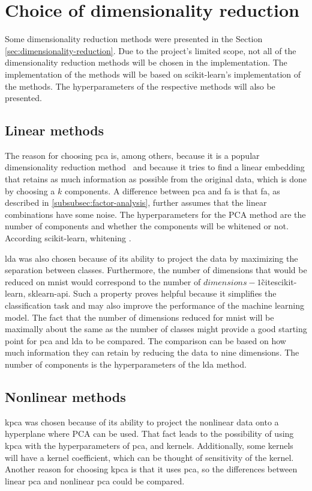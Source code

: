 \section{Choice of dimensionality reduction}\label{sec:choice-of-dimensionality-reduction}
Some dimensionality reduction methods were presented in the Section \ref{sec:dimensionality-reduction}. Due to the project's limited scope, not all of the dimensionality reduction methods will be chosen in the implementation. The implementation of the methods will be based on scikit-learn's implementation of the methods. The hyperparameters of the respective methods will also be presented.



\subsection{Linear methods}
The reason for choosing \gls{pca} is, among others, because it is a popular dimensionality reduction method~\cite{dimensionality-reduction-comparative-review} and because it tries to find a linear embedding that retains as much information as possible from the original data, which is done by choosing a $k$ components. A difference between \gls{pca} and \gls{fa} is that \gls{fa}, as described in \ref{subsubsec:factor-analysis}, further assumes that the linear combinations have some noise. The hyperparameters for the PCA method are the number of components and whether the components will be whitened or not. According scikit-learn, whitening .


\gls{lda} was also chosen because of its ability to project the data by maximizing the separation between classes. Furthermore, the number of dimensions that would be reduced on \gls{mnist} would correspond to the number of $dimensions-1$\~cite{scikit-learn, sklearn-api}. Such a property proves helpful because it simplifies the classification task and may also improve the performance of the machine learning model. The fact that the number of dimensions reduced for \gls{mnist} will be maximally about the same as the number of classes might provide a good starting point for \gls{pca} and \gls{lda} to be compared. The comparison can be based on how much information they can retain by reducing the data to nine dimensions. The number of components is the hyperparameters of the \gls{lda} method.


\subsection{Nonlinear methods}
\gls{kpca} was chosen because of its ability to project the nonlinear data onto a hyperplane where PCA can be used. That fact leads to the possibility of using \gls{kpca} with the hyperparameters of \gls{pca}, and kernels. Additionally, some kernels will have a kernel coefficient, which can be thought of sensitivity of the kernel. Another reason for choosing \gls{kpca} is that it uses \gls{pca}, so the differences between linear \gls{pca} and nonlinear \gls{pca} could be compared.

